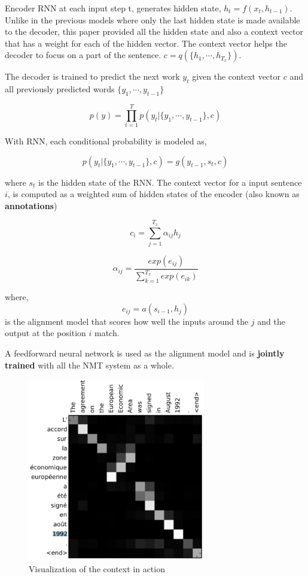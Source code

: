 \documentclass[a4paper]{article}
\begin{document}
Encoder  RNN  at each  input step t,  generates  hidden state,  $h_t  =  f(x_t,
h_{t-1})$. Unlike in the previous models where only the last hidden state is made available
to the decoder, this paper  provided  all  the hidden state  and also a  context
vector that has a weight for each of the hidden vector. The context vector helps
the decoder to focus on a part of the sentence. $c = q(\{h_1,\cdots,h_{T_x}\})$.


The decoder is  trained to predict the next work $y_t$ given  the context vector
$c$ and all previously predicted words $\{ y_1, \cdots, y_{t-1}\}$


\begin{equation*}
  p(y) = \prod^{T}_{t=1} p(y_t | \{ y_1, \cdots, y_{t-1}\} ,c )
\end{equation*}


With RNN, each conditional probability is modeled as,


\begin{equation*}
  p(y_t | \{ y_1, \cdots, y_{t-1}\}, c) = g(y_{t-1}, s_t, c)
\end{equation*}


where  $s_t$ is the hidden  state  of  the RNN. The context vector  for a  input
sentence $i$, is  computed  as  a weighted  sum of  hidden states of the encoder
(also known as \textbf{annotations})


\begin{equation*}
  c_i = \sum_{j=1}^{T_{x}} \alpha_{ij} h_j
\end{equation*}


\begin{equation*}
  \alpha_{ij} = \frac{ exp(e_{ij})}{ \sum_{k=1}^{T_x} exp (e_{ik})}
\end{equation*}

where, $$ e_{ij}  = a(s_{i-1},  h_j)  $$ is the alignment model that  scores how
well the inputs around the $j$ and the output at the position $i$ match.


A   feedforward  neural  network   is  used  as   the  alignment  model  and  is
\textbf{jointly trained} with all the NMT system as a whole.


\begin{figure}
  \includegraphics[height=8cm]{img/contextres.png}
  \caption{Visualization of the context in action}
  \label{fig:contextvis}
\end{figure}
\end{document}
